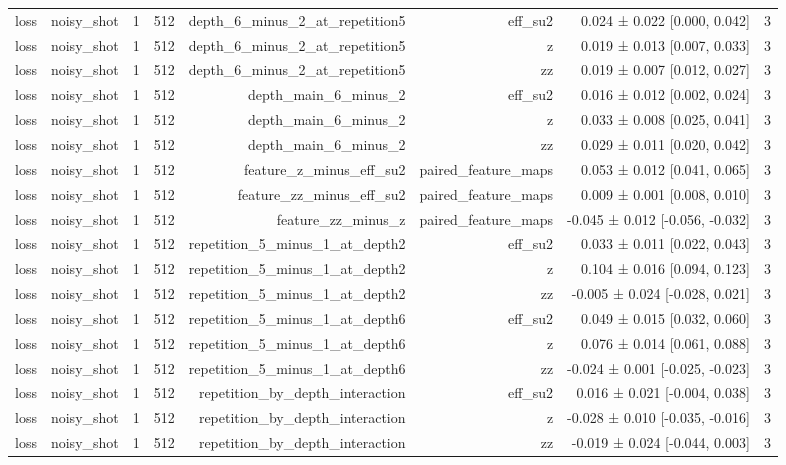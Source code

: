 \begin{table}
\begin{tabular}{lrrrrrrr}
loss & noisy\_shot & 1 & 512 & depth\_6\_minus\_2\_at\_repetition5 & eff\_su2 & 0.024 ± 0.022 [0.000, 0.042] & 3 \\
loss & noisy\_shot & 1 & 512 & depth\_6\_minus\_2\_at\_repetition5 & z & 0.019 ± 0.013 [0.007, 0.033] & 3 \\
loss & noisy\_shot & 1 & 512 & depth\_6\_minus\_2\_at\_repetition5 & zz & 0.019 ± 0.007 [0.012, 0.027] & 3 \\
loss & noisy\_shot & 1 & 512 & depth\_main\_6\_minus\_2 & eff\_su2 & 0.016 ± 0.012 [0.002, 0.024] & 3 \\
loss & noisy\_shot & 1 & 512 & depth\_main\_6\_minus\_2 & z & 0.033 ± 0.008 [0.025, 0.041] & 3 \\
loss & noisy\_shot & 1 & 512 & depth\_main\_6\_minus\_2 & zz & 0.029 ± 0.011 [0.020, 0.042] & 3 \\
loss & noisy\_shot & 1 & 512 & feature\_z\_minus\_eff\_su2 & paired\_feature\_maps & 0.053 ± 0.012 [0.041, 0.065] & 3 \\
loss & noisy\_shot & 1 & 512 & feature\_zz\_minus\_eff\_su2 & paired\_feature\_maps & 0.009 ± 0.001 [0.008, 0.010] & 3 \\
loss & noisy\_shot & 1 & 512 & feature\_zz\_minus\_z & paired\_feature\_maps & -0.045 ± 0.012 [-0.056, -0.032] & 3 \\
loss & noisy\_shot & 1 & 512 & repetition\_5\_minus\_1\_at\_depth2 & eff\_su2 & 0.033 ± 0.011 [0.022, 0.043] & 3 \\
loss & noisy\_shot & 1 & 512 & repetition\_5\_minus\_1\_at\_depth2 & z & 0.104 ± 0.016 [0.094, 0.123] & 3 \\
loss & noisy\_shot & 1 & 512 & repetition\_5\_minus\_1\_at\_depth2 & zz & -0.005 ± 0.024 [-0.028, 0.021] & 3 \\
loss & noisy\_shot & 1 & 512 & repetition\_5\_minus\_1\_at\_depth6 & eff\_su2 & 0.049 ± 0.015 [0.032, 0.060] & 3 \\
loss & noisy\_shot & 1 & 512 & repetition\_5\_minus\_1\_at\_depth6 & z & 0.076 ± 0.014 [0.061, 0.088] & 3 \\
loss & noisy\_shot & 1 & 512 & repetition\_5\_minus\_1\_at\_depth6 & zz & -0.024 ± 0.001 [-0.025, -0.023] & 3 \\
loss & noisy\_shot & 1 & 512 & repetition\_by\_depth\_interaction & eff\_su2 & 0.016 ± 0.021 [-0.004, 0.038] & 3 \\
loss & noisy\_shot & 1 & 512 & repetition\_by\_depth\_interaction & z & -0.028 ± 0.010 [-0.035, -0.016] & 3 \\
loss & noisy\_shot & 1 & 512 & repetition\_by\_depth\_interaction & zz & -0.019 ± 0.024 [-0.044, 0.003] & 3 \\

\end{tabular}
\end{table}
